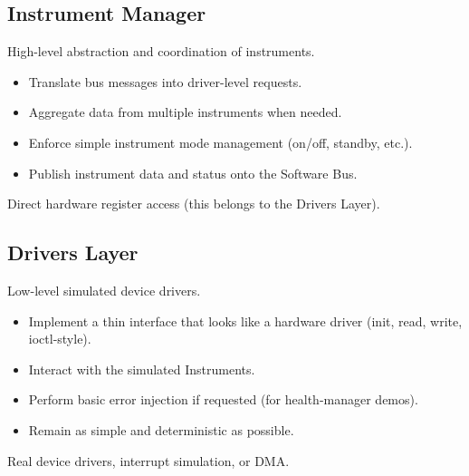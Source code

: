 \documentclass[11pt,a4paper]{article}
\begin{document}
\subsection{Instrument Manager}
\begin{description}[style=nextline, leftmargin=1.5em]
    \item[Primary role] High-level abstraction and coordination of instruments.
    \item[Responsibilities]
    \begin{itemize}
        \item Translate bus messages into driver-level requests.
        \item Aggregate data from multiple instruments when needed.
        \item Enforce simple instrument mode management (on/off, standby, etc.).
        \item Publish instrument data and status onto the Software Bus.
    \end{itemize}
    \item[Non-responsibilities] Direct hardware register access (this belongs to the Drivers Layer).
\end{description}

\subsection{Drivers Layer}
\begin{description}[style=nextline, leftmargin=1.5em]
    \item[Primary role] Low-level simulated device drivers.
    \item[Responsibilities]
    \begin{itemize}
        \item Implement a thin interface that looks like a hardware driver (init, read, write, ioctl-style).
        \item Interact with the simulated Instruments.
        \item Perform basic error injection if requested (for health-manager demos).
        \item Remain as simple and deterministic as possible.
    \end{itemize}
    \item[Non-responsibilities] Real device drivers, interrupt simulation, or DMA.
\end{description}
\end{document}
